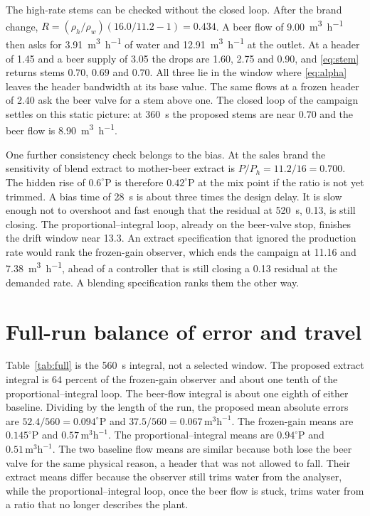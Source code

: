 \documentclass[conference,a4paper]{IEEEtran}
\newcommand{\degP}{^{\circ}\mathrm{P}}
\begin{document}
The high-rate stems can be checked without the closed loop. After the brand change, $R=(\rho_h/\rho_w)(16.0/11.2-1)=0.434$. A beer flow of \SI{9.00}{\cubic\metre\per\hour} then asks for \SI{3.91}{\cubic\metre\per\hour} of water and \SI{12.91}{\cubic\metre\per\hour} at the outlet. At a header of \SI{1.45}{\barg} and a beer supply of \SI{3.05}{\barg} the drops are \SI{1.60}{\barg}, \SI{2.75}{\barg} and \SI{0.90}{\barg}, and \eqref{eq:stem} returns stems $0.70$, $0.69$ and $0.70$. All three lie in the window where \eqref{eq:alpha} leaves the header bandwidth at its base value. The same flows at a frozen header of \SI{2.40}{\barg} ask the beer valve for a stem above one. The closed loop of the campaign settles on this static picture: at \SI{360}{s} the proposed stems are near $0.70$ and the beer flow is \SI{8.90}{\cubic\metre\per\hour}.

One further consistency check belongs to the bias. At the sales brand the sensitivity of blend extract to mother-beer extract is $P/P_h=11.2/16=0.700$. The hidden rise of $0.6\degP$ is therefore $0.42\degP$ at the mix point if the ratio is not yet trimmed. A bias time of \SI{28}{s} is about three times the design delay. It is slow enough not to overshoot and fast enough that the residual at \SI{520}{s}, \SI{0.13}{\plato}, is still closing. The proportional--integral loop, already on the beer-valve stop, finishes the drift window near \SI{13.3}{\plato}. An extract specification that ignored the production rate would rank the frozen-gain observer, which ends the campaign at \SI{11.16}{\plato} and \SI{7.38}{\cubic\metre\per\hour}, ahead of a controller that is still closing a \SI{0.13}{\plato} residual at the demanded rate. A blending specification ranks them the other way.

\section{Full-run balance of error and travel}
Table~\ref{tab:full} is the \SI{560}{s} integral, not a selected window. The proposed extract integral is $64$ percent of the frozen-gain observer and about one tenth of the proportional--integral loop. The beer-flow integral is about one eighth of either baseline. Dividing by the length of the run, the proposed mean absolute errors are $52.4/560=0.094\degP$ and $37.5/560=0.067\,\mathrm{m}^3\mathrm{h}^{-1}$. The frozen-gain means are $0.145\degP$ and $0.57\,\mathrm{m}^3\mathrm{h}^{-1}$. The proportional--integral means are $0.94\degP$ and $0.51\,\mathrm{m}^3\mathrm{h}^{-1}$. The two baseline flow means are similar because both lose the beer valve for the same physical reason, a header that was not allowed to fall. Their extract means differ because the observer still trims water from the analyser, while the proportional--integral loop, once the beer flow is stuck, trims water from a ratio that no longer describes the plant.
\end{document}

